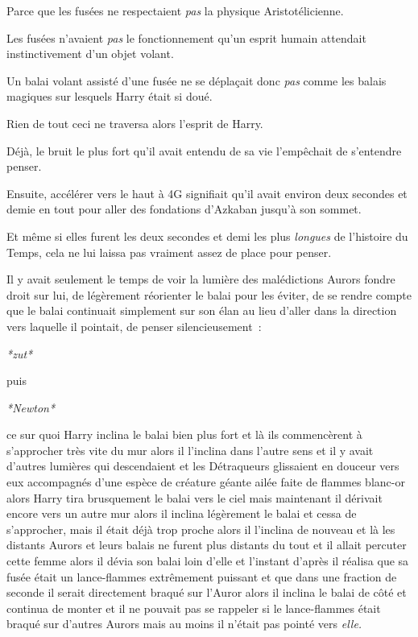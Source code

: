 Parce que les fusées ne respectaient \emph{pas} la physique Aristotélicienne.

Les fusées n'avaient \emph{pas} le fonctionnement qu'un esprit humain attendait instinctivement d'un objet volant.

Un balai volant assisté d'une fusée ne se déplaçait donc \emph{pas} comme les balais magiques sur lesquels Harry était si doué.

Rien de tout ceci ne traversa alors l'esprit de Harry.

Déjà, le bruit le plus fort qu'il avait entendu de sa vie l'empêchait de s'entendre penser.

Ensuite, accélérer vers le haut à 4G signifiait qu'il avait environ deux secondes et demie en tout pour aller des fondations d'Azkaban jusqu'à son sommet.

Et même si elles furent les deux secondes et demi les plus \emph{longues} de l'histoire du Temps, cela ne lui laissa pas vraiment assez de place pour penser.

Il y avait seulement le temps de voir la lumière des malédictions Aurors fondre droit sur lui, de légèrement réorienter le balai pour les éviter, de se rendre compte que le balai continuait simplement sur son élan au lieu d'aller dans la direction vers laquelle il pointait, de penser silencieusement~:

\emph{*zut*}

puis

\emph{*Newton*}

ce sur quoi Harry inclina le balai bien plus fort et là ils commencèrent à s'approcher très vite du mur alors il l'inclina dans l'autre sens et il y avait d'autres lumières qui descendaient et les Détraqueurs glissaient en douceur vers eux accompagnés d'une espèce de créature géante ailée faite de flammes blanc-or alors Harry tira brusquement le balai vers le ciel mais maintenant il dérivait encore vers un autre mur alors il inclina légèrement le balai et cessa de s'approcher, mais il était déjà trop proche alors il l'inclina de nouveau et là les distants Aurors et leurs balais ne furent plus distants du tout et il allait percuter cette femme alors il dévia son balai loin d'elle et l'instant d'après il réalisa que sa fusée était un lance-flammes extrêmement puissant et que dans une fraction de seconde il serait directement braqué sur l'Auror alors il inclina le balai de côté et continua de monter et il ne pouvait pas se rappeler si le lance-flammes était braqué sur d'autres Aurors mais au moins il n'était pas pointé vers \emph{elle.}

